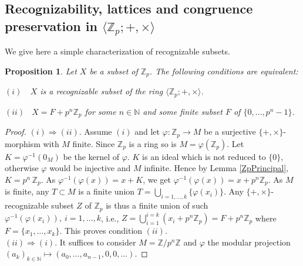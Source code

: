 \documentclass[11pt,a4paper]{article}
\newtheorem{proposition}[theorem]{Proposition}
\newtheorem{corollary}[theorem]{Corollary}
\theoremstyle{definition} %
\newcommand\+[1]{\mathcal{#1}} %
\newcommand{\N}{{\mathbb N}}     %
\newcommand{\Z}{{\mathbb Z}}     %
\begin{document}

%
 \subsection{Recognizability, lattices and congruence preservation  in $\langle  \Z_p ;+,\times\rangle$} \label{ss rec in Zp+}
 We  give here a simple characterization of recognizable subsets.
\begin{proposition}\label{prop:contZp}
Let $X$ be a subset of $\Z_p$.
The following conditions are equivalent:

$(i)$\ \ 
$X$ is a recognizable subset of the ring $\langle  \Z_p ;+,\times\rangle$.

$(ii)$ \ 
 $X=F+p^n\Z_p$ for some $n\in\N$ and some finite subset $F$ of
$\{0,\ldots,p^n-1\}$.
\end{proposition}
%
\begin{proof}

$(i)\Rightarrow(ii)$.
Assume $(i)$ and let $\varphi:\Z_p\to M$ be a surjective $\{+,\times\}$-morphism
with $M$ finite. %
Since $\Z_p$ is a ring  so is $M=\varphi(\Z_p)$.
Let $K=\varphi^{-1}(0_M)$ %
be the kernel of $\varphi$. $K$  is an ideal which is not reduced to $\{0\}$, otherwise $\varphi$ would be injective and $M$ infinite. Hence by Lemma \ref{ZpPrincipal}, 
 $K=p^n\,\Z_p$.
As $\varphi^{-1}(\varphi(x))=x+K$, we get
$\varphi^{-1}(\varphi(x))=x+p^n\Z_p$.
As $M$ is finite, any $T\subset M$ is a finite union $T=\bigcup_{i=1,\ldots,k}\{\varphi(x_i)\}$.
Any $\{+,\times\}$-recognizable subset $Z$ of $\Z_p$ is thus a finite union of such
$\varphi^{-1}(\varphi(x_i)),\ i=1,\ldots,k$, i.e.,  
$Z=\bigcup_{i=1}^{i=k}(x_i+p^{n}\Z_p)=F+p^n\Z_p$ where
$F=\{x_1,\ldots,x_k\}$.
This proves condition $(ii)$.
%
\smallskip\\
 $(ii)\Rightarrow(i)$.
It suffices to consider $M=\Z/p^n\Z$ and $\varphi$  the modular projection
$(a_k)_{k\in\N}\mapsto(a_0,\ldots,a_{n-1},0,0,\ldots)$.
\end{proof}
%
\end{document}

